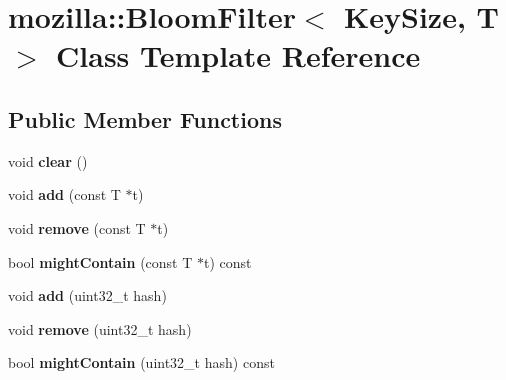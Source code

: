 \hypertarget{classmozilla_1_1_bloom_filter}{\section{mozilla\-:\-:Bloom\-Filter$<$ Key\-Size, T $>$ Class Template Reference}
\label{classmozilla_1_1_bloom_filter}
}
\subsection*{Public Member Functions}
\begin{DoxyCompactItemize}
\item 
\hypertarget{classmozilla_1_1_bloom_filter_abc5cd6c59a5767ed4b138a81823dce53}{void {\bfseries clear} ()}\label{classmozilla_1_1_bloom_filter_abc5cd6c59a5767ed4b138a81823dce53}

\item 
\hypertarget{classmozilla_1_1_bloom_filter_aa206f7d2430016a0b46068b680977004}{void {\bfseries add} (const T $\ast$t)}\label{classmozilla_1_1_bloom_filter_aa206f7d2430016a0b46068b680977004}

\item 
\hypertarget{classmozilla_1_1_bloom_filter_ab275fba393dd24134a61b44e9175e298}{void {\bfseries remove} (const T $\ast$t)}\label{classmozilla_1_1_bloom_filter_ab275fba393dd24134a61b44e9175e298}

\item 
\hypertarget{classmozilla_1_1_bloom_filter_a2a719f5a9f807a93447ac76183c3271b}{bool {\bfseries might\-Contain} (const T $\ast$t) const }\label{classmozilla_1_1_bloom_filter_a2a719f5a9f807a93447ac76183c3271b}

\item 
\hypertarget{classmozilla_1_1_bloom_filter_a4b6c046ad25b3419f025ab33400ba099}{void {\bfseries add} (uint32\-\_\-t hash)}\label{classmozilla_1_1_bloom_filter_a4b6c046ad25b3419f025ab33400ba099}

\item 
\hypertarget{classmozilla_1_1_bloom_filter_a20351a6b5b22946827a7827d5eb47dee}{void {\bfseries remove} (uint32\-\_\-t hash)}\label{classmozilla_1_1_bloom_filter_a20351a6b5b22946827a7827d5eb47dee}

\item 
\hypertarget{classmozilla_1_1_bloom_filter_a50b59d6fa11cded484b50b9904e69cc0}{bool {\bfseries might\-Contain} (uint32\-\_\-t hash) const }\label{classmozilla_1_1_bloom_filter_a50b59d6fa11cded484b50b9904e69cc0}


\end{DoxyCompactItemize}
